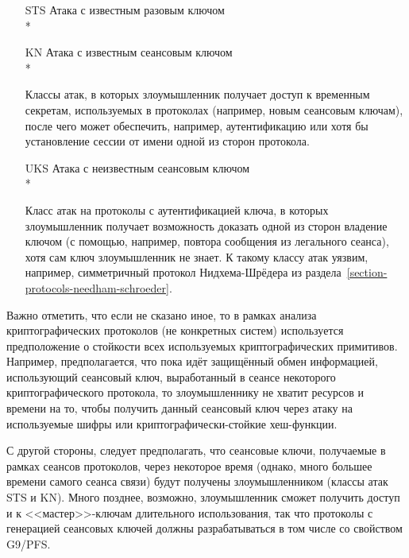 \begin{itemize}
    \item[STS] Атака с известным разовым ключом\\*
    \item[KN] Атака с известным сеансовым ключом\\*
    \item[{}] Классы атак, в которых злоумышленник получает доступ к временным секретам, используемых в протоколах (например, новым сеансовым ключам), после чего может обеспечить, например, аутентификацию или хотя бы установление сессии от имени одной из сторон протокола.

    \item[UKS] Атака с неизвестным сеансовым ключом\\*
    \item[{}] Класс атак на протоколы с аутентификацией ключа, в которых злоумышленник получает возможность доказать одной из сторон владение ключом (с помощью, например, повтора сообщения из легального сеанса), хотя сам ключ злоумышленник не знает. К такому классу атак уязвим, например, симметричный протокол Нидхема-Шрёдера из раздела~\ref{section-protocols-needham-schroeder}.

\end{itemize}

Важно отметить, что если не сказано иное, то в рамках анализа криптографических протоколов (не конкретных систем) используется предположение о стойкости всех используемых криптографических примитивов. Например, предполагается, что пока идёт защищённый обмен информацией, использующий сеансовый ключ, выработанный в сеансе некоторого криптографического протокола, то злоумышленнику не хватит ресурсов и времени на то, чтобы получить данный сеансовый ключ через атаку на используемые шифры или криптографически-стойкие хеш-функции.

С другой стороны, следует предполагать, что сеансовые ключи, получаемые в рамках сеансов протоколов, через некоторое время (однако, много большее времени самого сеанса связи) будут получены злоумышленником (классы атак STS и KN). Много позднее, возможно, злоумышленник сможет получить доступ и к <<мастер>>-ключам длительного использования, так что протоколы с генерацией сеансовых ключей должны разрабатываться в том числе со свойством G9/PFS.
